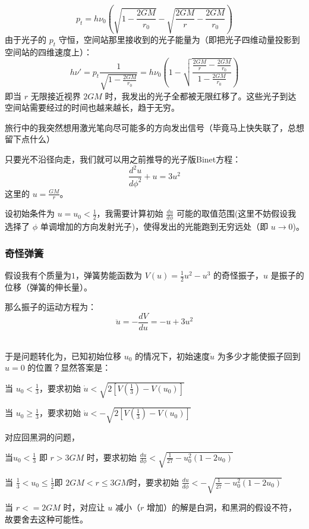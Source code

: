 \documentclass[CJK,13pt]{beamer}
\begin{document}
  \begin{frame}
    $$p_t = h\nu_0\left(\sqrt{1-\frac{2GM}{r_0}} - \sqrt{\frac{2GM}{r}-\frac{2GM}{r_0}}\right)$$
    由于光子的 $p_t$ 守恒，空间站那里接收到的光子能量为（即把光子四维动量投影到空间站的四维速度上）：
    $$ h\nu' = p_t \frac{1}{\sqrt{1-\frac{2GM}{r_0}}} = h\nu_0\left(1 - \sqrt{\frac{\frac{2GM}{r}-\frac{2GM}{r_0}}{1-\frac{2GM}{r_0}} }\right) $$
    即当 $r$ 无限接近视界 $2GM$ 时，我发出的光子全都被无限红移了。这些光子到达空间站需要经过的时间也越来越长，趋于无穷。

  \end{frame}



  \begin{frame}
    旅行中的我突然想用激光笔向尽可能多的方向发出信号（毕竟马上快失联了，总想留下点什么）

    只要光不沿径向走，我们就可以用之前推导的光子版Binet方程：
    $$\frac{d^2u}{d\phi^2}+u = 3u^2$$
    这里的 $u=\frac{GM}{r}$。

    设初始条件为 $u=u_0<\frac{1}{2}$，我需要计算初始 $\frac{du}{d\phi}$ 可能的取值范围(这里不妨假设我选择了 $\phi$ 单调增加的方向发射光子)，使得发出的光能跑到无穷远处（即 $u\rightarrow 0$)。
  \end{frame}


  \begin{frame}
    \frametitle{奇怪弹簧}
    假设我有个质量为$1$，弹簧势能函数为 $V(u) = \frac{1}{2}u^2-u^3$ 的奇怪振子，$u$ 是振子的位移（弹簧的伸长量）。

    那么振子的运动方程为：
    $$ \ddot u = -\frac{dV}{du} = -u + 3u^2 $$    
    \emini
    \ 
    \emini
    

    于是问题转化为，已知初始位移 $u_0$ 的情况下，初始速度$\dot u$ 为多少才能使振子回到 $u=0$ 的位置？显然答案是：

    \bitem
  \item{当 $u_0<\frac{1}{3}$，要求初始 $\dot u < \sqrt{2\left[V\left(\frac{1}{3}\right)-V\left(u_0\right)\right]}$}
  \item{当 $u_0\ge \frac{1}{3}$，要求初始 $\dot u < - \sqrt{2\left[V\left(\frac{1}{3}\right)-V\left(u_0\right)\right]}$}
    \eitem
  \end{frame}

  \begin{frame}
    对应回黑洞的问题，
    \bitem
  \item{当$u_0<\frac{1}{3}$ 即 $r>3GM$ 时，要求初始 $\frac{du}{d\phi} < \sqrt{\frac{1}{27}-u_0^2(1-2u_0)}$}
  \item{当 $\frac{1}{3}<u_0\le \frac{1}{2}$即 $2GM<r\le 3GM$时，要求初始 $\frac{du}{d\phi}<-\sqrt{\frac{1}{27}-u_0^2(1-2u_0)}$}
  \item{当 $r<=2GM$ 时，对应让 $u$ 减小（$r$ 增加）的解是白洞，和黑洞的假设不符，故要舍去这种可能性。}
    \eitem
  \end{frame}
\end{document}

